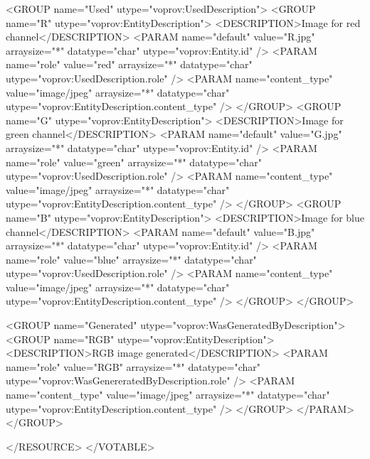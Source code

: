 \begin{verbnobox}[\scriptsize]
    <GROUP name="Used" utype="voprov:UsedDescription">
      <GROUP name="R" utype="voprov:EntityDescription">
        <DESCRIPTION>Image for red channel</DESCRIPTION>
        <PARAM name="default" value="R.jpg" arraysize="*" datatype="char" utype="voprov:Entity.id" />
        <PARAM name="role" value="red" arraysize="*" datatype="char" 
            utype="voprov:UsedDescription.role" />
        <PARAM name="content_type" value="image/jpeg" arraysize="*" datatype="char" 
            utype="voprov:EntityDescription.content_type" />
      </GROUP>
      <GROUP name="G" utype="voprov:EntityDescription">
        <DESCRIPTION>Image for green channel</DESCRIPTION>
        <PARAM name="default" value="G.jpg" arraysize="*" datatype="char" utype="voprov:Entity.id" />
        <PARAM name="role" value="green" arraysize="*" datatype="char" 
            utype="voprov:UsedDescription.role" />
        <PARAM name="content_type" value="image/jpeg" arraysize="*" datatype="char" 
           utype="voprov:EntityDescription.content_type" />
      </GROUP>
      <GROUP name="B" utype="voprov:EntityDescription">
        <DESCRIPTION>Image for blue channel</DESCRIPTION>
        <PARAM name="default" value="B.jpg" arraysize="*" datatype="char" utype="voprov:Entity.id" />
        <PARAM name="role" value="blue" arraysize="*" datatype="char" 
            utype="voprov:UsedDescription.role" />
        <PARAM name="content_type" value="image/jpeg" arraysize="*" datatype="char" 
            utype="voprov:EntityDescription.content_type" />
      </GROUP>
    </GROUP>
    
    <GROUP name="Generated" utype="voprov:WasGeneratedByDescription">
      <GROUP name="RGB" utype="voprov:EntityDescription">
        <DESCRIPTION>RGB image generated</DESCRIPTION>
        <PARAM name="role" value="RGB" arraysize="*" datatype="char" 
            utype="voprov:WasGenereratedByDescription.role" />
        <PARAM name="content_type" value="image/jpeg" arraysize="*" datatype="char" 
            utype="voprov:EntityDescription.content_type" />
      </GROUP>
      </PARAM>
    </GROUP>
    
  </RESOURCE>
</VOTABLE>

\end{verbnobox}

